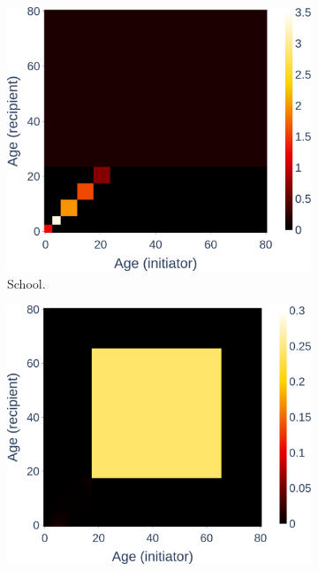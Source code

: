 \begin{figure} 
  \begin{subfigure}[b]{0.45\linewidth}
    \centering
    \includegraphics[width=\linewidth]{3 - Stride/fig/school_contact_heatmap.png} 
    \caption{School.} 
    \label{fig:school_contact_heatmap} 
    \vspace{4ex}
  \end{subfigure}%
  \hfill
  \begin{subfigure}[b]{0.45\linewidth}
    \centering
    \includegraphics[width=\linewidth]{3 - Stride/fig/work_contact_heatmap.png} 

\end{subfigure}
\end{figure}
